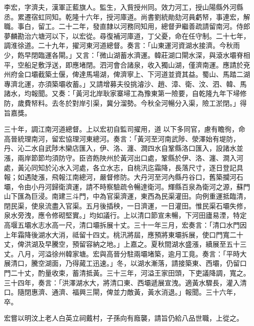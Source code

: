\begin{pinyinscope}
李宏，字濟夫，漢軍正藍旗人。監生，入貲授州同。效力河工，授山陽縣外河縣丞。累遷宿虹同知。乾隆十六年，授河庫道。尚書劉統勛劾河員虧帑，事連宏，解職。事白，留工。二十二年，發直隸以河務同知用，總督尹繼善疏請留南河。侍郎夢麟勘治六塘河以下，以宏從。尋復補河庫道，丁父憂，命在任守制。二十七年，調淮徐道。二十九年，擢河東河道總督。奏言：「山東運河資湖水接濟。今秋雨少，飭早閉臨運各閘。」又言：「微山湖蓄水濟運。韓莊湖口閘水深，與滾水壩脊相平，空船足敷浮送，即應堵閉。泗河會合諸泉，收入獨山湖，僅濟南運。應請於兗州府金口壩截築土偃，俾達馬場湖，俾濟寧上、下河道並資其益。蜀山、馬踏二湖專濟北運，亦須築壩收蓄。」又請增募夫役挑濬沙、趙、漳、衛、汶、泗、韓、馬諸水，均報聞。又奏：「黃河北岸耿家寨埽工為豫東第一險要，自乾隆九年下埽修防，歲費帑料。去冬於對岸引渠，冀分溜勢。今秋全河暢分入渠，險工淤閉。」得旨嘉獎。

三十年，調江南河道總督。上以宏初自監司擢用，道以下多同官，慮有瞻徇，命高晉統理南河，留宏協理河東總河。奏言：「黃河至河南武陟、滎澤始有堤防，丹、沁二水自武陟木欒店匯入，伊、洛、瀍、澗四水自鞏縣洛口匯入，設諸水並漲，兩岸節節均須防守。臣咨飭陜州於黃河出口處，鞏縣於伊、洛、瀍、澗入河處，黃沁同知於沁水入河處，各立水志，自桃汛迄霜降，長落尺寸，逐日登記具報；如遇陡漲，飛報江南總河，嚴督修防。大丹河至河內縣丹谷口，舊築攔河石壩，令由小丹河歸衛濟運，請不時察驗疏令暢達衛河。輝縣百泉為衛河之源，蘇門山下匯為巨浸。南建三斗門，中為官渠濟運，東西為民渠灌田。向例重運抵臨清，閉民渠，使泉流盡入官渠。五月後插秧，一日濟運，一日灌田。惟民渠石壩失修，泉水旁洩，應令修砌堅實。」均如議行。上以清口節宣未暢，下河田廬易湮，特定高堰五壩水志水高一尺，清口壩拆展十丈。三十一年三月，宏奏言：「清口水門因上年霜降後湖水大消，祗留十四丈。桃汛將屆，應預將東壩拆展，使口門寬二十丈，俾洪湖及早騰空，預留容納之地。」上嘉之。夏秋間湖水盛漲，續展至五十三丈。八月，河溢徐州韓家塘。宏與高晉分駐兩壩堵築，逾月工竟。奏言：「平時大展清口，騰空湖面，乃得蕆工迅速。」冬，以湖水漸落，請接築東、西壩，仍留口門二十丈，酌量收束，蓄清抵黃。三十三年，河溢王家田頭，下吏議降調，寬之。三十四年，奏言：「洪澤湖水大，將清口東、西壩遞展宣洩。適黃水驟長，灌入清口。隨閉惠濟、通濟、福興三閘，俾並力敵黃，黃水消退。」報聞。三十六年，卒。

宏嘗以明汶上老人白英立祠戴村，子孫向有廕襲，請旨仍給八品世職，上從之。


\end{pinyinscope}
